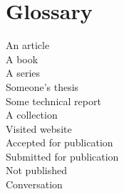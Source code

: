 \documentclass[letterpaper,12pt]{report}
\begin{document}
\lstlistoflistings
{}
\clearpage


\section*{Glossary}

\clearpage

\setcounter{page}{1}

\clearpage
{}\clearpage
{}\clearpage
{}\clearpage
{}\clearpage
{}\clearpage

An article \cite{anarticle}\\
A book \cite{abook}\\
A series \cite{bookseries}\\
Someone's thesis \cite{thesis}\\
Some technical report \cite{report}\\
A collection \cite{collection}\\
Visited website \cite{website}\\
Accepted for publication \cite{acceptedpub}\\
Submitted for publication \cite{unpub}\\
Not published \cite{notpub}\\
Conversation \cite{conv}




\clearpage
\end{document}
